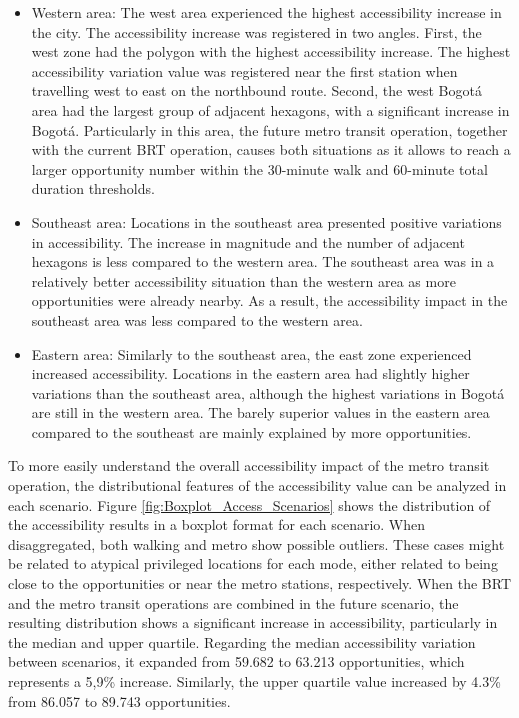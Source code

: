 \documentclass[12pt, a4paper]{report}
\begin{document}
\begin{itemize}
    \item Western area: The west area experienced the highest accessibility increase in the city. The accessibility increase was registered in two angles. First, the west zone had the polygon with the highest accessibility increase. The highest accessibility variation value was registered near the first station when travelling west to east on the northbound route. Second, the west Bogotá area had the largest group of adjacent hexagons, with a significant increase in Bogotá. Particularly in this area, the future metro transit operation, together with the current BRT operation, causes both situations as it allows to reach a larger opportunity number within the 30-minute walk and 60-minute total duration thresholds.
    \item Southeast area: Locations in the southeast area presented positive variations in accessibility. The increase in magnitude and the number of adjacent hexagons is less compared to the western area. The southeast area was in a relatively better accessibility situation than the western area as more opportunities were already nearby. As a result, the accessibility impact in the southeast area was less compared to the western area.
    \item Eastern area: Similarly to the southeast area, the east zone experienced increased accessibility. Locations in the eastern area had slightly higher variations than the southeast area, although the highest variations in Bogotá are still in the western area. The barely superior values in the eastern area compared to the southeast are mainly explained by more opportunities.
\end{itemize}

To more easily understand the overall accessibility impact of the metro transit operation, the distributional features of the accessibility value can be analyzed in each scenario. Figure \ref{fig:Boxplot_Access_Scenarios} shows the distribution of the accessibility results in a boxplot format for each scenario. When disaggregated, both walking and metro show possible outliers. These cases might be related to atypical privileged locations for each mode, either related to being close to the opportunities or near the metro stations, respectively. When the BRT and the metro transit operations are combined in the future scenario, the resulting distribution shows a significant increase in accessibility, particularly in the median and upper quartile. Regarding the median accessibility variation between scenarios, it expanded from 59.682 to 63.213 opportunities, which represents a 5,9\% increase. Similarly, the upper quartile value increased by 4.3\% from 86.057 to 89.743 opportunities.
\end{document}
